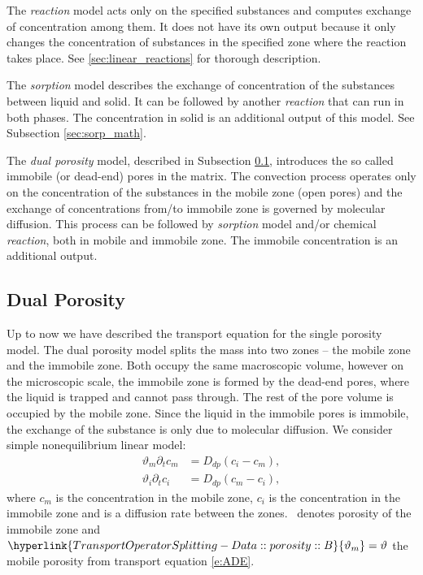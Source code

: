 The \emph{reaction} model acts only on the specified substances and computes exchange of concentration 
among them. It does not have its own output because it only changes the concentration of substances 
in the specified zone where the reaction takes place. See \ref{sec:linear_reactions} for thorough description.

The \emph{sorption} model describes the exchange of concentration of the substances between liquid and solid. It can be
followed by another \emph{reaction} that can run in both phases. The concentration in solid is an additional output 
of this model. See Subsection \ref{sec:sorp_math}.


The \emph{dual porosity} model, described in Subsection \ref{sec:dual_porosity}, introduces the so called immobile (or dead-end) pores in the matrix. The convection process operates only on the concentration of the substances in the mobile zone (open pores) 
and the exchange of concentrations from/to immobile zone is governed by molecular diffusion. This process can be followed by 
\emph{sorption} model and/or chemical \emph{reaction}, both in mobile and immobile zone. The immobile concentration is an
additional output.


\subsection{Dual Porosity}
\label{sec:dual_porosity}

Up to now we have described the transport equation for the single porosity model. The dual porosity model splits the mass into 
two zones -- the mobile zone and the immobile zone. Both occupy the same macroscopic volume, however on the microscopic scale, 
the immobile zone is formed by the dead-end pores, where the liquid is trapped and cannot pass through. The rest of the pore volume 
is occupied by the mobile zone. Since the liquid in the immobile pores is immobile, the exchange of the substance is only due 
to molecular diffusion. We consider simple nonequilibrium linear model:
\begin{align}
    \vartheta_m \partial_t c_m &= D_{dp} ( c_i - c_m), \label{eqn:dual_porosity_ode1}\\
    \vartheta_i \partial_t c_i &= D_{dp} ( c_m - c_i), \label{eqn:dual_porosity_ode2}
\end{align}
where $c_m$ is the concentration in the mobile zone, $c_i$ is the concentration in the immobile zone and
 is a diffusion rate between the zones.
~denotes porosity of the immobile zone  and 
$\hyperlink{TransportOperatorSplitting-Data::porosity::B}{\vartheta_m} = \vartheta$ the mobile porosity from transport equation \eqref{e:ADE}.

